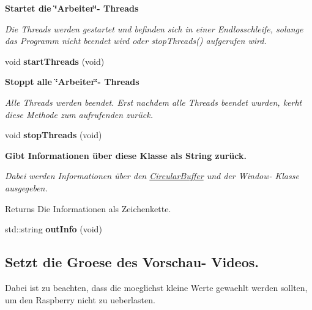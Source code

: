\begin{Indent}{\bf Startet die \char`\"{}\+Arbeiter\char`\"{}-\/ Threads}\par
{\em Die Threads werden gestartet und befinden sich in einer Endlosschleife, solange das Programm nicht beendet wird oder stop\+Threads() aufgerufen wird. }\begin{DoxyCompactItemize}
\item 
\hypertarget{classrc_1_1BlobDetectorFactory_afecac9963fc4e69e51422ce59cf540f3}{void {\bfseries start\+Threads} (void)}\label{classrc_1_1BlobDetectorFactory_afecac9963fc4e69e51422ce59cf540f3}

\end{DoxyCompactItemize}
\end{Indent}
\begin{Indent}{\bf Stoppt alle \char`\"{}\+Arbeiter\char`\"{}-\/ Threads}\par
{\em Alle Threads werden beendet. Erst nachdem alle Threads beendet wurden, kerht diese Methode zum aufrufenden zurück. }\begin{DoxyCompactItemize}
\item 
\hypertarget{classrc_1_1BlobDetectorFactory_a9dc44508f5a3dd4beaee0813b7443194}{void {\bfseries stop\+Threads} (void)}\label{classrc_1_1BlobDetectorFactory_a9dc44508f5a3dd4beaee0813b7443194}

\end{DoxyCompactItemize}
\end{Indent}
\begin{Indent}{\bf Gibt Informationen über diese Klasse als String zurück.}\par
{\em Dabei werden Informationen über den \hyperlink{classrc_1_1CircularBuffer}{Circular\+Buffer} und der Window-\/ Klasse ausgegeben.

\begin{DoxyReturn}{Returns}
Die Informationen als Zeichenkette. 
\end{DoxyReturn}
}\begin{DoxyCompactItemize}
\item 
\hypertarget{classrc_1_1BlobDetectorFactory_a08e56c167bd2f928d2f808d429d8327e}{std\+::string {\bfseries out\+Info} (void)}\label{classrc_1_1BlobDetectorFactory_a08e56c167bd2f928d2f808d429d8327e}

\end{DoxyCompactItemize}
\end{Indent}
\subsection*{Setzt die Groese des Vorschau-\/ Videos.}
\label{_amgrp31fff75453dbcfb0cbda6f83097f2790}%
Dabei ist zu beachten, dass die moeglichst kleine Werte gewaehlt werden sollten, um den Raspberry nicht zu ueberlasten.


